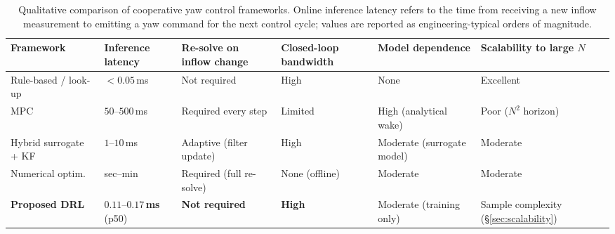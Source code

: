 \documentclass[final,5p,times]{elsarticle}
\begin{document}
\begin{table}[h]
\centering
\caption{Qualitative comparison of cooperative yaw control frameworks. Online inference latency refers to the time from receiving a new inflow measurement to emitting a yaw command for the next control cycle; values are reported as engineering-typical orders of magnitude.}
\label{tab:framework_comparison}
\small
\begin{tabular}{p{2.2cm}p{1.6cm}p{1.6cm}p{1.5cm}p{1.7cm}p{1.7cm}}
\toprule
Framework & Inference latency & Re-solve on inflow change & Closed-loop bandwidth & Model dependence & Scalability to large $N$ \\
\midrule
Rule-based / look-up & $<0.05$\,ms & Not required & High & None & Excellent \\
MPC & $50$--$500$\,ms & Required every step & Limited & High (analytical wake) & Poor ($N^2$ horizon) \\
Hybrid surrogate + KF~\citep{Doekemeijer2019} & $1$--$10$\,ms & Adaptive (filter update) & High & Moderate (surrogate model) & Moderate \\
Numerical optim. & sec--min & Required (full re-solve) & None (offline) & Moderate & Moderate \\
\textbf{Proposed DRL} & $\mathbf{0.11}$--$\mathbf{0.17}$\,\textbf{ms} (p50) & \textbf{Not required} & \textbf{High} & Moderate (training only) & Sample complexity (\S\ref{sec:scalability}) \\
\bottomrule
\end{tabular}
\end{table}
\end{document}
